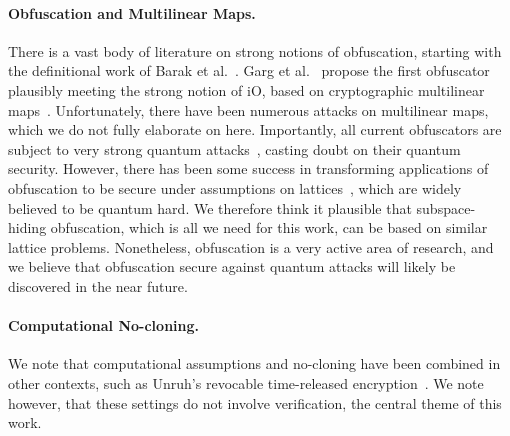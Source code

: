 \paragraph{Obfuscation and Multilinear Maps.}  There is a vast body of literature on strong notions of obfuscation, starting with the definitional work of Barak et al.~\cite{C:BGIRSVY01}.  Garg et al.~\cite{FOCS:GGHRSW13} propose the first obfuscator plausibly meeting the strong notion of iO, based on cryptographic multilinear maps~\cite{EC:GarGenHal13,C:CorLepTib13,TCC:GenGorHal15}.  Unfortunately, there have been numerous attacks on multilinear maps, which we do not fully elaborate on here.  Importantly, all current obfuscators are subject to very strong quantum attacks~\cite{EC:CDPR16,C:AlbBaiDuc16,CJL16,EC:CheGenHal17}, casting doubt on their quantum security.  However, there has been some success in transforming applications of obfuscation to be secure under assumptions on lattices~\cite{ITCS:BVWW16,EPRINT:WicZir17,EPRINT:GoyKopWat17}, which are widely believed to be quantum hard.   We therefore think it plausible that subspace-hiding obfuscation, which is all we need for this work, can be based on similar lattice problems.  Nonetheless, obfuscation is a very active area of research, and we believe that obfuscation secure against quantum attacks will likely be discovered in the near future.

\paragraph{Computational No-cloning.} We note that computational assumptions and no-cloning have been combined in other contexts, such as Unruh's revocable time-released encryption~\cite{EC:Unruh14}.  We note however, that these settings do not involve verification, the central theme of this work.
